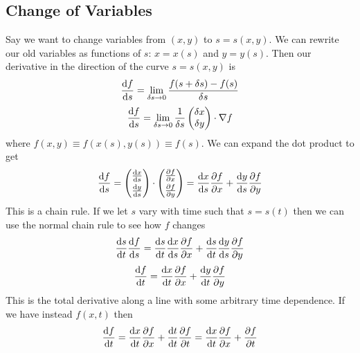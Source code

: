 \documentclass{article}
\renewcommand{\grad}{\nabla}
\begin{document}
    \subsection{Change of Variables}
    Say we want to change variables from \((x, y)\) to \(s = s(x, y)\).
    We can rewrite our old variables as functions of \(s\): \(x = x(s)\) and \(y = y(s)\).
    Then our derivative in the direction of the curve \(s = s(x, y)\) is
    \[\dv{f}{s} = \lim_{\delta s\to 0}\frac{f(s + \delta s) - f(s)}{\delta s}\]
    \[
        \dv{f}{s} = \lim_{\delta s\to 0}\frac{1}{\delta s}
        \begin{pmatrix}
            \delta x \\ \delta y
        \end{pmatrix}
        \cdot \grad f
    \]
    where \(f(x, y)\equiv f(x(s), y(s))\equiv f(s)\).
    We can expand the dot product to get
    \begin{equation}\label{eqn:chain rule 1}
        \dv{f}{s} = 
        \begin{pmatrix}
            \dv{x}{s} \\[0.1cm] \dv{y}{s}
        \end{pmatrix}
        \cdot
        \begin{pmatrix}
            \pdv{f}{x} \\[0.1cm] \pdv{f}{y}
        \end{pmatrix}
        = \dv{x}{s}\pdv{f}{x} + \dv{y}{s}\pdv{f}{y}
    \end{equation}
    This is a chain rule.
    If we let \(s\) vary with time such that \(s = s(t)\) then we can use the normal chain rule to see how \(f\) changes
    \[\dv{s}{t}\dv{f}{s} = \dv{s}{t}\dv{x}{s}\pdv{f}{x} + \dv{s}{t}\dv{y}{s}\pdv{f}{y}\]
    \[\dv{f}{t} = \dv{x}{t}\pdv{f}{x} + \dv{y}{t}\pdv{f}{y}\]
    This is the total derivative along a line with some arbitrary time dependence.
    If we have instead \(f(x, t)\) then
    \[\dv{f}{t} = \dv{x}{t}\pdv{f}{x} + \dv{t}{t}\pdv{f}{t} = \dv{x}{t}\pdv{f}{x} + \pdv{f}{t}\]
    
\end{document}
